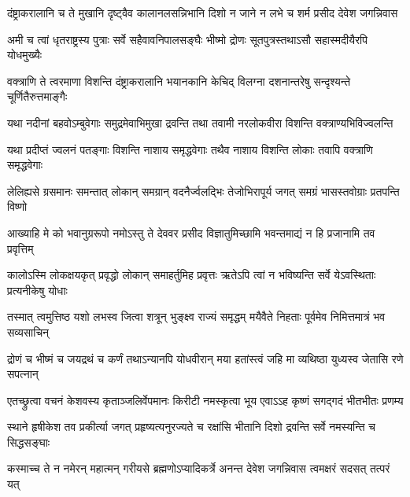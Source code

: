 \fourlineindentedshloka
{दंष्ट्राकरालानि च ते मुखानि}
{दृष्ट्वैव कालानलसन्निभानि}
{दिशो न जाने न लभे च शर्म}
{प्रसीद देवेश जगन्निवास}%

\fourlineindentedshloka
{अमी च त्वां धृतराष्ट्रस्य पुत्राः}
{सर्वे सहैवावनिपालसङ्घैः}
{भीष्मो द्रोणः सूतपुत्रस्तथाऽसौ}
{सहास्मदीयैरपि योधमुख्यैः}%

\fourlineindentedshloka
{वक्त्राणि ते त्वरमाणा विशन्ति}
{दंष्ट्राकरालानि भयानकानि}
{केचिद् विलग्ना दशनान्तरेषु}
{सन्दृश्यन्ते चूर्णितैरुत्तमाङ्गैः}%

\fourlineindentedshloka
{यथा नदीनां बहवोऽम्बुवेगाः}
{समुद्रमेवाभिमुखा द्रवन्ति}
{तथा तवामी नरलोकवीरा}
{विशन्ति वक्त्राण्यभिविज्वलन्ति}%

\fourlineindentedshloka
{यथा प्रदीप्तं ज्वलनं पतङ्गाः}
{विशन्ति नाशाय समृद्धवेगाः}
{तथैव नाशाय विशन्ति लोकाः}
{तवापि वक्त्राणि समृद्धवेगाः}%

\fourlineindentedshloka
{लेलिह्यसे ग्रसमानः समन्तात्}
{लोकान् समग्रान् वदनैर्ज्वलद्भिः}
{तेजोभिरापूर्य जगत् समग्रं}
{भासस्तवोग्राः प्रतपन्ति विष्णो}%

\fourlineindentedshloka
{आख्याहि मे को भवानुग्ररूपो}
{नमोऽस्तु ते देववर प्रसीद}
{विज्ञातुमिच्छामि भवन्तमाद्यं}
{न हि प्रजानामि तव प्रवृत्तिम्}%


\fourlineindentedshloka
{कालोऽस्मि लोकक्षयकृत् प्रवृद्धो}
{लोकान् समाहर्तुमिह प्रवृत्तः}
{ऋतेऽपि त्वां न भविष्यन्ति सर्वे}
{येऽवस्थिताः प्रत्यनीकेषु योधाः}%

\fourlineindentedshloka
{तस्मात् त्वमुत्तिष्ठ यशो लभस्व}
{जित्वा शत्रून् भुङ्क्ष्व राज्यं समृद्धम्}
{मयैवैते निहताः पूर्वमेव}
{निमित्तमात्रं भव सव्यसाचिन्}%

\fourlineindentedshloka
{द्रोणं च भीष्मं च जयद्रथं च}
{कर्णं तथाऽन्यानपि योधवीरान्}
{मया हतांस्त्वं जहि मा व्यथिष्ठा}
{युध्यस्व जेतासि रणे सपत्नान्}%


\fourlineindentedshloka
{एतच्छ्रुत्वा वचनं केशवस्य}
{कृताञ्जलिर्वेपमानः किरीटी}
{नमस्कृत्वा भूय एवाऽऽह कृष्णं}
{सगद्गदं भीतभीतः प्रणम्य}%


\fourlineindentedshloka
{स्थाने हृषीकेश तव प्रकीर्त्या}
{जगत् प्रहृष्यत्यनुरज्यते च}
{रक्षांसि भीतानि दिशो द्रवन्ति}
{सर्वे नमस्यन्ति च सिद्धसङ्घाः}%

\fourlineindentedshloka
{कस्माच्च ते न नमेरन् महात्मन्}
{गरीयसे ब्रह्मणोऽप्यादिकर्त्रे}
{अनन्त देवेश जगन्निवास}
{त्वमक्षरं सदसत् तत्परं यत्}%

